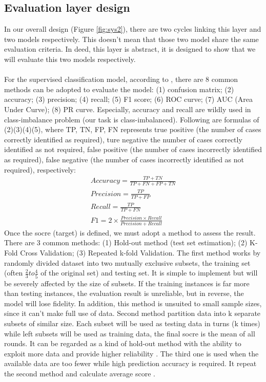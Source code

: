 \subsection{Evaluation layer design}
\label{sec:evaluation}
In our overall design (Figure \ref{fig:sys2}), there are two cycles linking this layer and two models respectively. This doesn't mean that those two model share the same evaluation criteria. In deed, this layer is abstract, it is designed to show that we will evaluate this two models respectively. 
\\\\For the supervised classification model, according to \cite{Chollet:2017:DLP:3203489}, there are 8 common methods can be adopted to evaluate the model: (1) confusion matrix; (2) accuracy; (3) precision; (4) recall; (5) F1 score; (6) ROC curve; (7) AUC (Area Under Curve); (8) PR curve. Especially, accuracy and recall are wildly used in class-imbalance problem (our task is class-imbalanced). Following are formulas of (2)(3)(4)(5), where TP, TN, FP, FN represents true positive (the number of cases correctly identified as required), ture negative the number of cases correctly identified as not required, false positive (the number of cases incorrectly identified as required), false negative (the number of cases incorrectly identified as not required), respectively:
\begin{displaymath}
    \begin{array}{c}
        Accuracy = \frac{TP+TN}{TP+FN+FP+TN} \\
        Precision = \frac{TP}{TP+FP}\\
        Recall = \frac{TP}{TP+FN}\\
        F1 = 2\times\frac{Precision \times Recall}{Precision + Recall}
    \end{array}
\end{displaymath}
Once the socre (target) is defined, we must adopt a method to assess the result. There are 3 common methods: (1) Hold-out method (test set estimation); (2) K-Fold Cross Validation; (3) Repeated k-fold Validation. The first method works by randomly divided dataset into two mutually exclusive subsets, the training set (often $\frac{2}{3} to \frac{4}{5}$ of the original set) and testing set. It is simple to implement but will be severely affected by the size of subsets. If the training instances is far more than testing instances, the evaluation result is unreliable, but in reverse, the model will lose fidelity. In addition, this method is unsuited to small sample sizes, since it can't make full use of data\cite{omary2010machine,Chollet:2017:DLP:3203489}. Second method partition data into k separate subsets of similar size. Each subset will be used as testing data in turns (k times) while left subsets will be used as training data, the final socre is the mean of all rounds. It can be regarded as a kind of hold-out method with the ability to exploit more data and provide higher reliability \cite{omary2010machine}. The third one is used when the available data are too fewer while high prediction accuracy is required. It repeat the second method and calculate average score \cite{Chollet:2017:DLP:3203489}.  \\
